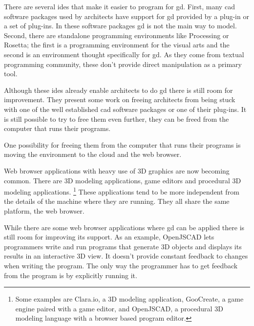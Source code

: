 \documentclass{./llncs2e/llncs}
\begin{document}
	There are several \ac{ide}s that make it easier to program for \ac{gd}. 
	First, many \ac{cad} software packages used by architects have support for \ac{gd} provided by a plug-in or a set of plug-ins.
	In these software packages \ac{gd} is not the main way to model.
	Second, there are standalone programming environments like Processing\cite{reas2007processing} or Rosetta\cite{de2012modern}; the first is a programming environment for the visual arts and the second is an environment thought specifically for \ac{gd}. 
	As they come from textual programming community, these don't provide direct manipulation as a primary tool.

	Although these \ac{ide}s already enable architects to do \ac{gd} there is still room for improvement.
	They present some work on freeing architects from being stuck with one of the well established \ac{cad} software packages or one of their plug-ins.
	It is still possible to try to free them even further, they can be freed from the computer that runs their programs.

	One possibility for freeing them from the computer that runs their programs is moving the environment to the cloud and the web browser.


	Web browser applications with heavy use of 3D graphics are now becoming common.
	There are 3D modeling applications, game editors and procedural 3D modeling applications.
	\footnote{Some examples are Clara.io\cite{houston2013clara}, a 3D modeling application, GooCreate\cite{goocreate2015site}, a game engine paired with a game editor, and OpenJSCAD\cite{openjscad2015site}, a procedural 3D modeling language with a browser based program editor.}
	These applications tend to be more independent from the details of the machine where they are running.
	They all share the same platform, the web browser.

	While there are some web browser applications where \ac{gd} can be applied there is still room for improving its support.
	As an example, OpenJSCAD lets programmers write and run programs that generate 3D objects and displays its results in an interactive 3D view.
	It doesn't provide constant feedback to changes when writing the program.
	The only way the programmer has to get feedback from the program is by explicitly running it.
\end{document}
